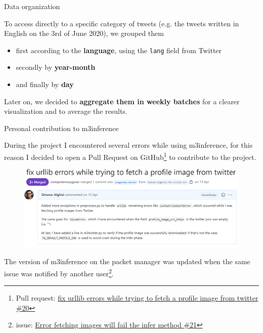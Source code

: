 \documentclass[8pt]{beamer}  %
\begin{document}
\begin{frame}{Data organization}

	To access directly to a specific category of tweets (e.g. the tweets written in English on the 3rd of June 2020), we grouped them 
	
	\begin{itemize}
	    \item first according to the \textbf{language}, using the \texttt{lang} field from Twitter
	    \item secondly by \textbf{year-month}
	    \item and finally by \textbf{day}
	\end{itemize}
	
    Later on, we decided to \textbf{aggregate them in weekly batches} for a clearer visualization and to average the results.

\end{frame}

\begin{frame}{Personal contribution to m3inference}

	During the project I encountered several errors while using m3inference, for this reason I decided to open a Pull Request on GitHub\footnote{Pull request: \href{https://github.com/euagendas/m3inference/pull/20}{fix urllib errors while trying to fetch a profile image from twitter \#20}} to contribute to the project.
	
	\begin{figure}
	    \centering
	    \includegraphics[scale=0.165]{assets/img/pull_request.png}
	\end{figure}
	
	The version of m3inference on the packet manager was updated when the same issue was notified by another user\footnote{issue: \href{https://github.com/euagendas/m3inference/issues/21}{Error fetching images will fail the infer method \#21}}.
	
\end{frame}
\end{document}
